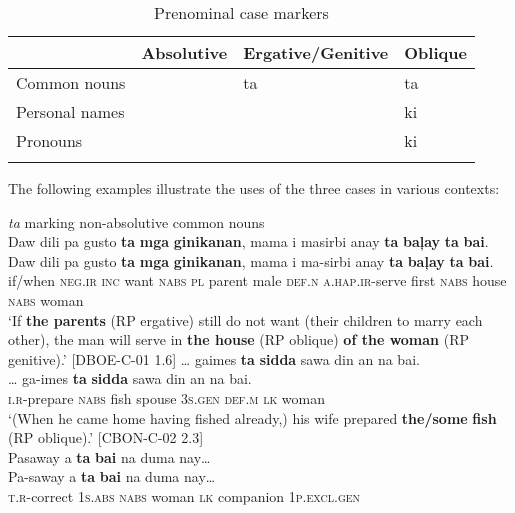 \begin{table}
\caption{Prenominal case markers}
\label{tab:prenominalcasemarkingparticles}
\begin{tabularx}{\textwidth}{XXll}
\lsptoprule
& Absolutive & Ergative/Genitive & Oblique \\
\midrule
Common nouns & \emptyset{} & ta  & ta  \\
 Personal names & \emptyset{} & \emptyset{} & ki \\
 Pronouns & \emptyset{} & \emptyset{} & ki \\
\lspbottomrule
\end{tabularx}
\end{table}

The following examples illustrate the uses of the three cases in various contexts:

\ea
\textit{ta} marking non-absolutive common nouns \\
Daw  dili  pa  gusto  \textbf{ta}  \textbf{mga}  \textbf{ginikanan}, mama  i  masirbi  anay  \textbf{ta}  \textbf{baļay}  \textbf{ta}  \textbf{bai}. \\\smallskip
 \gll Daw  dili  pa  gusto  \textbf{ta}  \textbf{mga}  \textbf{ginikanan}, mama  i  ma-sirbi  anay  \textbf{ta}  \textbf{baļay}  \textbf{ta}  \textbf{bai}. \\
if/when  \textsc{neg.ir}  \textsc{inc}  want  \textsc{nabs}  \textsc{pl}  parent male  \textsc{def.n}  \textsc{a.hap.ir}-serve  first  \textsc{nabs}  house  \textsc{nabs}  woman \\
\glt `If \textbf{the parents} (RP ergative) still do not want (their children to marry each other), the man will serve in \textbf{the house} (RP oblique) \textbf{of the woman} (RP genitive).’ [DBOE-C-01 1.6]
\z
\ea
… gaimes  \textbf{ta}  \textbf{sidda}  sawa  din  an  na  bai. \\\smallskip
 \gll … ga-imes  \textbf{ta}  \textbf{sidda}  sawa  din  an  na  bai. \\
{} \textsc{i.r}-prepare  \textsc{nabs}  fish  spouse  3\textsc{s.gen}  \textsc{def.m}  \textsc{lk}  woman \\
\glt ‘(When he came home having fished already,) his wife prepared \textbf{the/some} \textbf{fish} (RP oblique).’ [CBON-C-02  2.3] \\
\z
\ea
Pasaway  a  \textbf{ta}  \textbf{bai}  na  duma  nay… \\\smallskip
 \gll Pa-saway  a  \textbf{ta}  \textbf{bai}  na  duma  nay… \\
\textsc{t.r}-correct  1\textsc{s.abs}  \textsc{nabs}  woman  \textsc{lk}  companion  1\textsc{p.excl.gen} \\

